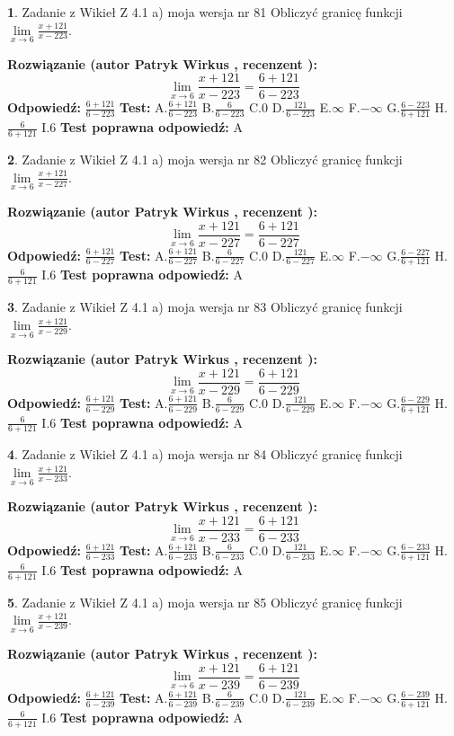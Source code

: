 \documentclass[12pt, a4paper]{article}
\theoremstyle{definition} %
\newtheorem{zad}{}
\newcommand{\zadStart}[1]{\begin{zad}#1\newline}
\newcommand{\zadStop}{\end{zad}}
\newcommand{\rozwStart}[2]{\noindent \textbf{Rozwiązanie (autor #1 , recenzent #2): }\newline}
\newcommand{\rozwStop}{\newline}
\newcommand{\odpStart}{\noindent \textbf{Odpowiedź:}\newline}
\newcommand{\odpStop}{\newline}
\newcommand{\testStart}{\noindent \textbf{Test:}\newline}
\newcommand{\testStop}{\newline}
\newcommand{\kluczStart}{\noindent \textbf{Test poprawna odpowiedź:}\newline}
\newcommand{\kluczStop}{\newline}
\begin{document}
\zadStart{Zadanie z Wikieł Z 4.1 a) moja wersja nr 81}
Obliczyć granicę funkcji $\lim\limits_{x\to6}\frac{x+121}{x-223}$.
\zadStop
\rozwStart{Patryk Wirkus}{}
$$\lim\limits_{x\to6}\frac{x+121}{x-223} = \frac{6+121}{6-223}$$
\rozwStop
\odpStart
$\frac{6+121}{6-223}$
\odpStop
\testStart
A.$\frac{6+121}{6-223}$
B.$\frac{6}{6-223}$
C.$0$
D.$\frac{121}{6-223}$
E.$\infty$
F.$-\infty$
G.$\frac{6-223}{6+121}$
H.$\frac{6}{6+121}$
I.$6$
\testStop
\kluczStart
A
\kluczStop



\zadStart{Zadanie z Wikieł Z 4.1 a) moja wersja nr 82}
Obliczyć granicę funkcji $\lim\limits_{x\to6}\frac{x+121}{x-227}$.
\zadStop
\rozwStart{Patryk Wirkus}{}
$$\lim\limits_{x\to6}\frac{x+121}{x-227} = \frac{6+121}{6-227}$$
\rozwStop
\odpStart
$\frac{6+121}{6-227}$
\odpStop
\testStart
A.$\frac{6+121}{6-227}$
B.$\frac{6}{6-227}$
C.$0$
D.$\frac{121}{6-227}$
E.$\infty$
F.$-\infty$
G.$\frac{6-227}{6+121}$
H.$\frac{6}{6+121}$
I.$6$
\testStop
\kluczStart
A
\kluczStop



\zadStart{Zadanie z Wikieł Z 4.1 a) moja wersja nr 83}
Obliczyć granicę funkcji $\lim\limits_{x\to6}\frac{x+121}{x-229}$.
\zadStop
\rozwStart{Patryk Wirkus}{}
$$\lim\limits_{x\to6}\frac{x+121}{x-229} = \frac{6+121}{6-229}$$
\rozwStop
\odpStart
$\frac{6+121}{6-229}$
\odpStop
\testStart
A.$\frac{6+121}{6-229}$
B.$\frac{6}{6-229}$
C.$0$
D.$\frac{121}{6-229}$
E.$\infty$
F.$-\infty$
G.$\frac{6-229}{6+121}$
H.$\frac{6}{6+121}$
I.$6$
\testStop
\kluczStart
A
\kluczStop



\zadStart{Zadanie z Wikieł Z 4.1 a) moja wersja nr 84}
Obliczyć granicę funkcji $\lim\limits_{x\to6}\frac{x+121}{x-233}$.
\zadStop
\rozwStart{Patryk Wirkus}{}
$$\lim\limits_{x\to6}\frac{x+121}{x-233} = \frac{6+121}{6-233}$$
\rozwStop
\odpStart
$\frac{6+121}{6-233}$
\odpStop
\testStart
A.$\frac{6+121}{6-233}$
B.$\frac{6}{6-233}$
C.$0$
D.$\frac{121}{6-233}$
E.$\infty$
F.$-\infty$
G.$\frac{6-233}{6+121}$
H.$\frac{6}{6+121}$
I.$6$
\testStop
\kluczStart
A
\kluczStop



\zadStart{Zadanie z Wikieł Z 4.1 a) moja wersja nr 85}
Obliczyć granicę funkcji $\lim\limits_{x\to6}\frac{x+121}{x-239}$.
\zadStop
\rozwStart{Patryk Wirkus}{}
$$\lim\limits_{x\to6}\frac{x+121}{x-239} = \frac{6+121}{6-239}$$
\rozwStop
\odpStart
$\frac{6+121}{6-239}$
\odpStop
\testStart
A.$\frac{6+121}{6-239}$
B.$\frac{6}{6-239}$
C.$0$
D.$\frac{121}{6-239}$
E.$\infty$
F.$-\infty$
G.$\frac{6-239}{6+121}$
H.$\frac{6}{6+121}$
I.$6$
\testStop
\kluczStart
A
\kluczStop
\end{document}
